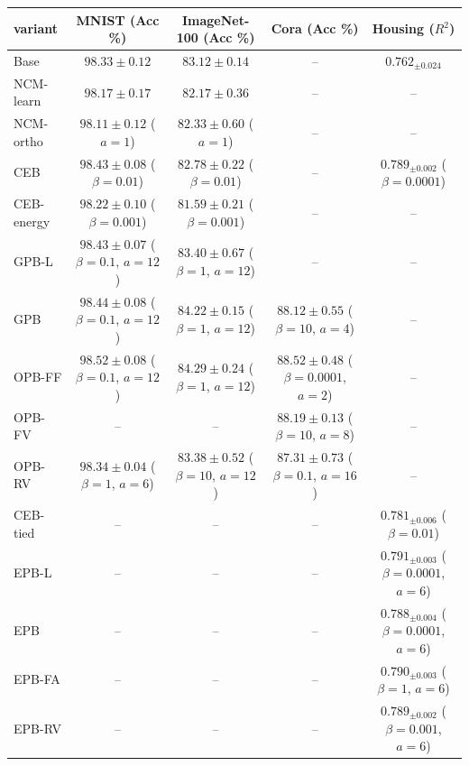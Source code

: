 \begin{tabular}{l c c c c}
\hline
variant & MNIST (Acc \%) & ImageNet-100 (Acc \%) & Cora (Acc \%) & Housing ($R^2$) \\
\hline
Base & $98.33 \pm 0.12$ & $83.12 \pm 0.14$ & -- & $0.762_{\pm 0.024}$ \\
NCM-learn & $98.17 \pm 0.17$ & $82.17 \pm 0.36$ & -- & -- \\
NCM-ortho & $98.11 \pm 0.12$ ($a=1$) & $82.33 \pm 0.60$ ($a=1$) & -- & -- \\
CEB & $98.43 \pm 0.08$ ($\beta=0.01$) & $82.78 \pm 0.22$ ($\beta=0.01$) & -- & $0.789_{\pm 0.002}$ ($\beta=0.0001$) \\
CEB-energy & $98.22 \pm 0.10$ ($\beta=0.001$) & $81.59 \pm 0.21$ ($\beta=0.001$) & -- & -- \\
GPB-L & $98.43 \pm 0.07$ ($\beta=0.1$, $a=12$) & $83.40 \pm 0.67$ ($\beta=1$, $a=12$) & -- & -- \\
GPB & $98.44 \pm 0.08$ ($\beta=0.1$, $a=12$) & $84.22 \pm 0.15$ ($\beta=1$, $a=12$) & $88.12 \pm 0.55$ ($\beta=10$, $a=4$) & -- \\
OPB-FF & $98.52 \pm 0.08$ ($\beta=0.1$, $a=12$) & $84.29 \pm 0.24$ ($\beta=1$, $a=12$) & $88.52 \pm 0.48$ ($\beta=0.0001$, $a=2$) & -- \\
OPB-FV & -- & -- & $88.19 \pm 0.13$ ($\beta=10$, $a=8$) & -- \\
OPB-RV & $98.34 \pm 0.04$ ($\beta=1$, $a=6$) & $83.38 \pm 0.52$ ($\beta=10$, $a=12$) & $87.31 \pm 0.73$ ($\beta=0.1$, $a=16$) & -- \\
CEB-tied & -- & -- & -- & $0.781_{\pm 0.006}$ ($\beta=0.01$) \\
EPB-L & -- & -- & -- & $0.791_{\pm 0.003}$ ($\beta=0.0001$, $a=6$) \\
EPB & -- & -- & -- & $0.788_{\pm 0.004}$ ($\beta=0.0001$, $a=6$) \\
EPB-FA & -- & -- & -- & $0.790_{\pm 0.003}$ ($\beta=1$, $a=6$) \\
EPB-RV & -- & -- & -- & $0.789_{\pm 0.002}$ ($\beta=0.001$, $a=6$) \\
\hline
\end{tabular}

